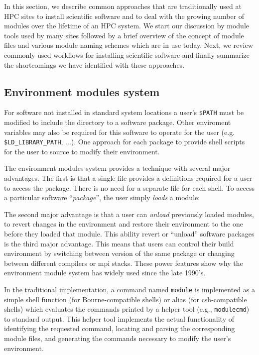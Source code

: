 In this section, we describe common approaches that are traditionally
used at HPC sites to install scientific software and to deal with the
growing number of modules over the lifetime of an HPC system. We start
our discussion by module tools used by many sites followed by a brief
overview of the concept of module files and various module naming
schemes which are in use today.  Next, we review commonly used
workflows for installing scientific software and finally summarize the
shortcomings we have identified with these approaches.

\subsection{Environment modules system}

For software not installed in standard system locations a user's \texttt{\$PATH}
must be modified to include the directory to a software package.  Other enviroment
variables may also be required for this software to operate for the
user (e.g. \texttt{\$LD\_LIBRARY\_PATH}, ...).  One approach for each package to
provide shell scripts for the user to source to modify their
environment. 
  
The environment modules system provides a technique with several major
advantages. The first is that a single file provides a definitions
required for a user to access the package.  There is no need for a
separate file for each shell.  To access a particular software
``\emph{package}'', the user simply \emph{loads} a module:
{\small
\begin{alltt}
    % module load \emph{package}
\end{alltt}
}
\noindent
The second major advantage is that a user can \emph{unload} previously
loaded modules, to revert changes in the environment and restore
their environment to the one before they loaded that module.
This ability revert or ``unload'' software 
packages is the third major advantage.  This means that users can
control their build environment by switching between version of the
same package or changing between different compilers or mpi stacks.
These power features show why the environment module system has widely
used since the late 1990's.


In the traditional implementation, a command named \texttt{module}
is implemented as a simple shell function (for Bourne-compatible shells) or
alias (for csh-compatible shells) which evaluates the commands printed by a
helper tool (e.g., \texttt{modulecmd}) to standard output. This helper tool
implements the actual functionality of identifying the requested command,
locating and parsing the corresponding module files, and generating the
commands necessary to modify the user's environment.

